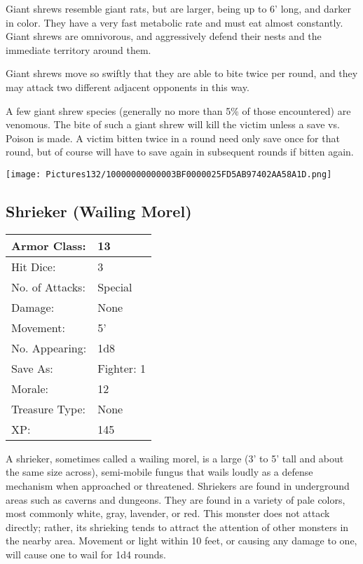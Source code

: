 \documentclass[a4paper,twoside,openany,10pt]{book}
\begin{document}
\begin{multicols}{2}
Giant shrews resemble giant rats, but are larger, being up to 6' long, and darker in color. They have a very fast metabolic rate and must eat almost constantly. Giant shrews are omnivorous, and aggressively defend their nests and the immediate territory around them.

Giant shrews move so swiftly that they are able to bite twice per round, and they may attack two different adjacent opponents in this way.

A few giant shrew species (generally no more than 5\% of those encountered) are venomous. The bite of such a giant shrew will kill the victim unless a save vs. Poison is made. A victim bitten twice in a round need only save once for that round, but of course will have to save again in subsequent rounds if bitten again.

\begin{center} \texttt{[image: Pictures132/10000000000003BF0000025FD5AB97402AA58A1D.png]} \end{center}


\subsection*{Shrieker (Wailing Morel)}\label{shrieker-wailing-morel}

\begin{tabularx}{0.50\textwidth}{@{}lX@{}}
Armor Class: & 13 \\\hline
Hit Dice: & 3 \\\hline
No. of Attacks: & Special \\\hline
Damage: & None \\\hline
Movement: & 5' \\\hline
No. Appearing: & 1d8 \\\hline
Save As: & Fighter: 1 \\\hline
Morale: & 12 \\\hline
Treasure Type: & None \\\hline
XP: & 145 \\\hline
\end{tabularx}\medskip

A shrieker, sometimes called a wailing morel,\textbf{ }is a large (3' to 5' tall and about the same size across), semi-mobile fungus that wails loudly as a defense mechanism when approached or threatened. Shriekers are found in underground areas such as caverns and dungeons. They are found in a variety of pale colors, most commonly white, gray, lavender, or red.  This monster does not attack directly; rather, its shrieking tends to attract the attention of other monsters in the nearby area. Movement or light within 10 feet, or causing any damage to one, will cause one to wail for 1d4 rounds.


\end{multicols}
\end{document}
